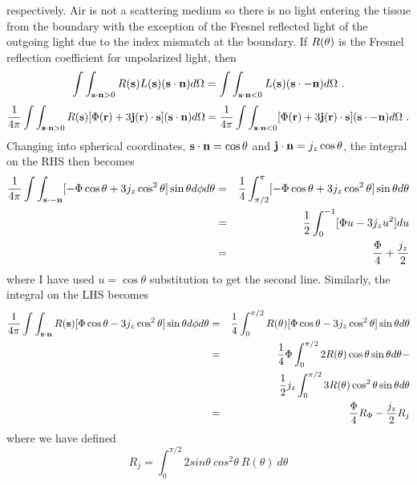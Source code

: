 respectively. Air is not a scattering medium so there is no light entering the tissue from the boundary with the exception of the Fresnel reflected light of the outgoing light due to the index mismatch at the boundary. If $R({\bf \theta})$ is the Fresnel reflection coefficient for unpolarized light, then
\begin{equation}
\label{bc1}
\int\int_{{\bf s} \cdot {\bf n} > 0} R({\bf s}) L({\bf s}) ({\bf s} \cdot {\bf n}) d\Omega =
\int\int_{{\bf s} \cdot {\bf n} < 0} L({\bf s}) ({\bf s} \cdot {- \bf
  n}) d\Omega \ .
\end{equation}
\begin{equation}
\label{bc2}
\frac{1}{4\pi}\int\int_{{\bf s} \cdot {\bf n} > 0} R({\bf s}) [ \Phi({\bf r}) + 3 {\bf j}({\bf r}) \cdot {\bf s}] ({\bf s} \cdot {\bf n}) d\Omega = \frac{1}{4\pi} \int\int_{{\bf s} \cdot {\bf n} < 0} [ \Phi({\bf r}) + 3 {\bf j}({\bf r}) \cdot {\bf s}] ({\bf s} \cdot {-\bf n}) d\Omega \ .
\end{equation}
Changing into spherical coordinates, ${\bf s}\cdot{\bf n}=\cos\theta$ and ${\bf j}\cdot{\bf n}=j_z\cos\theta$, the integral
on the RHS then becomes
\begin{eqnarray}
\label{bc3}
\frac{1}{4\pi}\int\int_{{\bf s} \cdot {-\bf n}} [-\Phi\cos\theta + 3j_z\cos^2\theta]\sin\theta d \phi d\theta &=& \frac{1}{4}\int_{\pi/2}^{\pi} [-\Phi\cos\theta + 3j_z\cos^2\theta]\sin\theta d\theta \nonumber\\ 
&=&\frac{1}{2}\int_{0}^{-1} [\Phi u - 3j_zu^2] du \notag \\
&=&\frac{\Phi}{4}+\frac{j_z}{2}
\end{eqnarray}
\noindent
where I have used $u=\cos\theta$ substitution to get the second line. Similarly, the integral on the LHS becomes
\begin{eqnarray}
\label{bc4}
\frac{1}{4\pi}\int\int_{{\bf s} \cdot {\bf n}} R({\bf s})[\Phi\cos\theta -
3j_z\cos^2\theta]\sin\theta d \phi d\theta &=&  \frac{1}{4}\int_{0}^{\pi/2}
 R({\bf \theta})[\Phi\cos\theta - 3j_z\cos^2\theta]\sin\theta d\theta \nonumber\\
&=& \frac{1}{4}\Phi\int_{0}^{\pi/2}2R({\bf \theta})\cos\theta\sin\theta
d\theta - \nonumber \\
& & \frac{1}{2} j_z\int_{0}^{\pi/2}3R({\bf \theta})\cos^2\theta\sin\theta d\theta \nonumber \\
&=&\frac{\Phi}{4}R_\Phi-\frac{j_z}{2}R_j
\end{eqnarray}
\noindent
where we have defined
\begin{equation}
\label{Rj}
R_j = \int_0^{\pi/2} 2 sin \theta \ cos^2 \theta \ R(\theta) \ d\theta
\end{equation}
